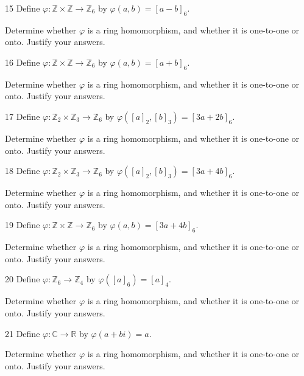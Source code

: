 \begin{problem}{15}
    Define $\varphi : \mathbb{Z} \times \mathbb{Z} \to \mathbb{Z}_6$ by $\varphi(a, b) = [a - b]_6$.

    Determine whether $\varphi$ is a ring homomorphism, and whether it is
    one-to-one or onto. Justify your answers.
\end{problem}
\unsolved

\begin{problem}{16}
    Define $\varphi : \mathbb{Z} \times \mathbb{Z} \to \mathbb{Z}_6$ by $\varphi(a, b) = [a + b]_6$.

    Determine whether $\varphi$ is a ring homomorphism, and whether it is
    one-to-one or onto. Justify your answers.
\end{problem}
\unsolved

\begin{problem}{17}
    Define $\varphi : \mathbb{Z}_2 \times \mathbb{Z}_3 \to \mathbb{Z}_6$ by $\varphi([a]_2, [b]_3) = [3a + 2b]_6$.

    Determine whether $\varphi$ is a ring homomorphism, and whether it is
    one-to-one or onto. Justify your answers.
\end{problem}
\unsolved

\begin{problem}{18}
    Define $\varphi : \mathbb{Z}_2 \times \mathbb{Z}_3 \to \mathbb{Z}_6$ by $\varphi([a]_2, [b]_3) = [3a + 4b]_6$.

    Determine whether $\varphi$ is a ring homomorphism, and whether it is
    one-to-one or onto. Justify your answers.
\end{problem}
\unsolved

\begin{problem}{19}
    Define $\varphi : \mathbb{Z} \times \mathbb{Z} \to \mathbb{Z}_6$ by $\varphi(a, b) = [3a + 4b]_6$.

    Determine whether $\varphi$ is a ring homomorphism, and whether it is
    one-to-one or onto. Justify your answers.
\end{problem}
\unsolved

\begin{problem}{20}
    Define $\varphi : \mathbb{Z}_6 \to \mathbb{Z}_4$ by $\varphi([a]_6) = [a]_4$.

    Determine whether $\varphi$ is a ring homomorphism, and whether it is
    one-to-one or onto. Justify your answers.
\end{problem}
\unsolved

\begin{problem}{21}
    Define $\varphi : \mathbb{C} \to \mathbb{R}$ by $\varphi(a + bi) = a$.

    Determine whether $\varphi$ is a ring homomorphism, and whether it is
    one-to-one or onto. Justify your answers.
\end{problem}
\unsolved

